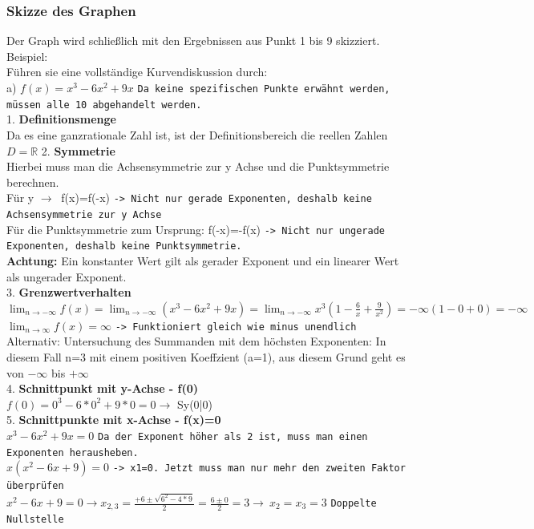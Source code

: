 \documentclass{article}
\newcommand{\R}{\mathbb{R}}
\begin{document}
	\subsubsection{Skizze des Graphen}
	Der Graph wird schließlich mit den Ergebnissen aus Punkt 1 bis 9 skizziert.
	Beispiel: \\
	Führen sie eine vollständige Kurvendiskussion durch: \\
	a) $f(x)=x^3-6x^2+9x$ \verb|Da keine spezifischen Punkte erwähnt werden, müssen alle 10 abgehandelt werden.|\\
	1. \textbf{Definitionsmenge} \\
	Da es eine ganzrationale Zahl ist, ist der Definitionsbereich die reellen Zahlen $D=\R$
	2. \textbf{Symmetrie} \\
	Hierbei muss man die Achsensymmetrie zur y Achse und die Punktsymmetrie berechnen. \\
	Für y $\to\ $ f(x)=f(-x) \verb|-> Nicht nur gerade Exponenten, deshalb keine Achsensymmetrie zur y Achse| \\
	Für die Punktsymmetrie zum Ursprung: f(-x)=-f(x) \verb|-> Nicht nur ungerade Exponenten, deshalb keine Punktsymmetrie.| \\
	\textbf{Achtung:} Ein konstanter Wert gilt als gerader Exponent und ein linearer Wert als ungerader Exponent.\\
	3. \textbf{Grenzwertverhalten} \\
	$\lim_{n\to-\infty}f(x)=\lim_{n\to-\infty}(x^3-6x^2+9x)=\lim_{n\to-\infty}x^3(1-\frac{6}{x}+\frac{9}{x^2})=-\infty(1-0+0)=-\infty$ \\
	$\lim_{n\to\infty}f(x)=\infty$ \verb|-> Funktioniert gleich wie minus unendlich| \\
	Alternativ: Untersuchung des Summanden mit dem höchsten Exponenten: In diesem Fall n=3 mit einem positiven Koeffzient (a=1), aus diesem Grund geht es von $-\infty$ bis $+\infty$ \\
	4. \textbf{Schnittpunkt mit y-Achse - f(0)} \\
	$f(0)=0^3-6*0^2+9*0=0\to$ Sy(0|0) \\
	5. \textbf{Schnittpunkte mit x-Achse - f(x)=0} \\
	$x^3-6x^2+9x=0$ \verb|Da der Exponent höher als 2 ist, muss man einen Exponenten herausheben.| \\
	$x(x^2-6x+9)=0$ \verb|-> x1=0. Jetzt muss man nur mehr den zweiten Faktor überprüfen| \\
	$x^2-6x+9=0\to x_{2,3}=\frac{+6\pm\sqrt{6^2-4*9}}{2}=\frac{6\pm0}{2}=3\to\ x_2=x_3=3$ \verb|Doppelte Nullstelle| \\
\end{document}
